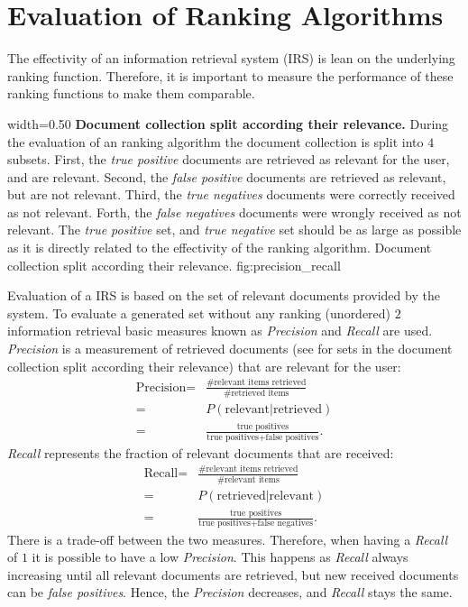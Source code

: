 \section{Evaluation of Ranking Algorithms}
\label{sec:evaluation_of_ranking_algorithms}

The effectivity of an information retrieval system (IRS) is lean on the underlying ranking function. Therefore, it is important to measure the performance of these ranking functions to make them comparable.

      {width=0.50\textwidth}
      {\textbf{Document collection split according their relevance.} During the evaluation of an ranking algorithm the document collection is split into $4$ subsets. First, the \textit{true positive} documents are retrieved as relevant for the user, and are relevant. Second, the \textit{false positive} documents are retrieved as relevant, but are not relevant. Third, the \textit{true negatives} documents were correctly received as not relevant. Forth, the \textit{false negatives} documents were wrongly received as not relevant. The \textit{true positive} set, and \textit{true negative} set should be as large as possible as it is directly related to the effectivity of the ranking algorithm.}
      {Document collection split according their relevance.}
      {fig:precision_recall}

Evaluation of a IRS is based on the set of relevant documents provided by the system. To evaluate a generated set without any ranking (unordered) $2$ information retrieval basic measures known as \textit{Precision} and \textit{Recall} are used. \textit{Precision} is a measurement of retrieved documents (see  for sets in the document collection split according their relevance) that are relevant for the user:
\begin{align}
  \label{precision}
  \text{Precision} = & \frac{\text{\# relevant items retrieved}}{\text{\# retrieved items}} \nonumber \\
    = & P(\text{relevant} | \text{retrieved}) \nonumber \\
    = & \frac{\text{true positives}}{\text{true positives} + \text{false positives}}.
\end{align}
\textit{Recall} represents the fraction of relevant documents that are received:
\begin{align}
  \text{Recall} = & \frac{\text{\# relevant items retrieved}}{\text{\# relevant items}} \nonumber \\
    = & P(\text{retrieved} | \text{relevant}) \nonumber \\
    = & \frac{\text{true positives}}{\text{true positives} + \text{false negatives}}.
\end{align}
There is a trade-off between the two measures. Therefore, when having a \textit{Recall} of $1$ it is possible to have a low \textit{Precision}. This happens as \textit{Recall} always increasing until all relevant documents are retrieved, but new received documents can be \textit{false positives}. Hence, the \textit{Precision} decreases, and \textit{Recall} stays the same.

